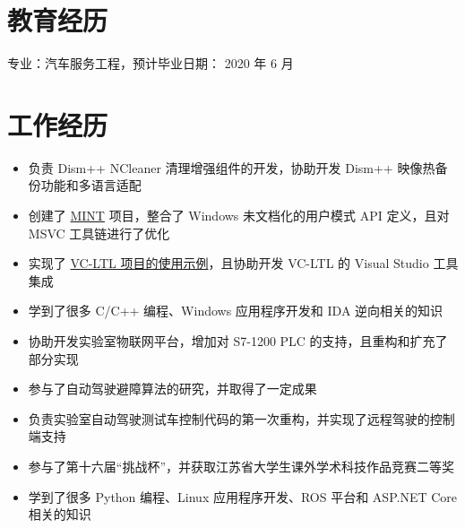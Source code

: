 \documentclass{resume}
\begin{document}
\renewcommand\headrulewidth{0pt}



\section{教育经历}

  专业：汽车服务工程，预计毕业日期： 2020 年 6 月

\section{工作经历}

\begin{itemize}
  \item 负责 Dism++ NCleaner 清理增强组件的开发，协助开发 Dism++ 映像热备份功能和多语言适配
  \item 创建了 \href{https://github.com/Chuyu-Team/MINT}{MINT} 项目，整合了 Windows 未文档化的用户模式 API 定义，且对 MSVC 工具链进行了优化
  \item 实现了 \href{https://github.com/Chuyu-Team/vc-ltl-samples}{VC-LTL 项目的使用示例}，且协助开发 VC-LTL 的 Visual Studio 工具集成
  \item 学到了很多 C/C++ 编程、Windows 应用程序开发和 IDA 逆向相关的知识
\end{itemize}

\begin{itemize}
  \item 协助开发实验室物联网平台，增加对 S7-1200 PLC 的支持，且重构和扩充了部分实现
  \item 参与了自动驾驶避障算法的研究，并取得了一定成果
  \item 负责实验室自动驾驶测试车控制代码的第一次重构，并实现了远程驾驶的控制端支持
  \item 参与了第十六届“挑战杯”，并获取江苏省大学生课外学术科技作品竞赛二等奖
  \item 学到了很多 Python 编程、Linux 应用程序开发、ROS 平台和 ASP.NET Core 相关的知识
\end{itemize}
\end{document}
